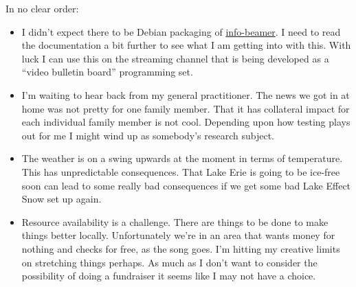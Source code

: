 In no clear order:

\begin{itemize}
\tightlist
\item
  I didn't expect there to be Debian packaging of
  \href{https://info-beamer.com/}{info-beamer}. I need to read the
  documentation a bit further to see what I am getting into with this.
  With luck I can use this on the streaming channel that is being
  developed as a ``video bulletin board'' programming set.
\item
  I'm waiting to hear back from my general practitioner. The news we got
  in at home was not pretty for one family member. That it has
  collateral impact for each individual family member is not cool.
  Depending upon how testing plays out for me I might wind up as
  somebody's research subject.\\
\item
  The weather is on a swing upwards at the moment in terms of
  temperature. This has unpredictable consequences. That Lake Erie is
  going to be ice-free soon can lead to some really bad consequences if
  we get some bad Lake Effect Snow set up again.
\item
  Resource availability is a challenge. There are things to be done to
  make things better locally. Unfortunately we're in an area that wants
  money for nothing and checks for free, as the song goes. I'm hitting
  my creative limits on stretching things perhaps. As much as I don't
  want to consider the possibility of doing a fundraiser it seems like I
  may not have a choice.
\end{itemize}
